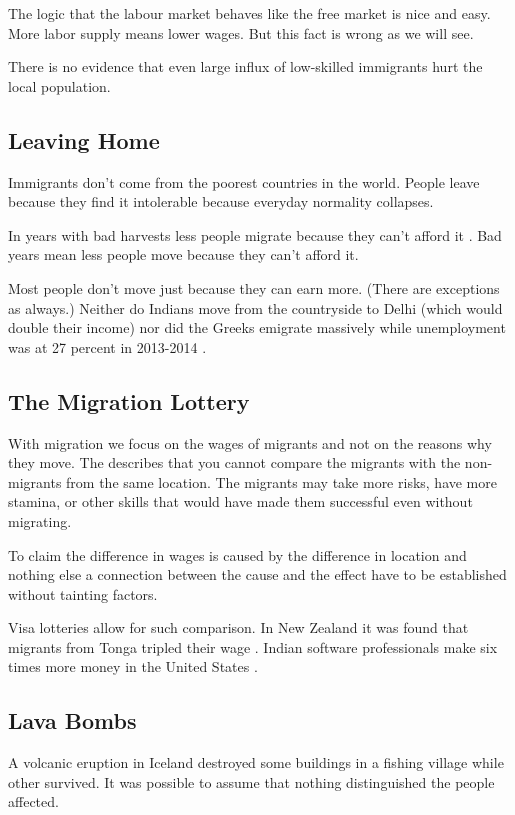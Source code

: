 \documentclass[a4paper, twocolumn]{article}
\let\oldsubsection\subsection
\newcounter{mysubsection}
\renewcommand{\subsection}{
    \stepcounter{mysubsection}
    \oldsubsection
}
\newcommand{\keyword}[1]{\textbf{\color{black}{#1}}}
\begin{document}
The logic that the labour market behaves like the free market is nice and easy. More labor supply means lower wages. But this fact is wrong as we will see.

There is no evidence that even large influx of low-skilled immigrants hurt the local population.

\subsection{Leaving Home}
Immigrants don't come from the poorest countries in the world. People leave because they find it intolerable because everyday normality collapses.

In years with bad harvests less people migrate because they can't afford it \cite{push-and-pull}.
Bad years mean less people move because they can't afford it.

Most people don't move just because they can earn more. (There are exceptions as always.) Neither do Indians move from the countryside to Delhi (which would double their income) nor did the Greeks emigrate massively while unemployment was at 27 percent in 2013-2014 \cite{greek-emigration}.

\subsection{The Migration Lottery}
With migration we focus on the wages of migrants and not on the reasons why they move. The \keyword{identification problem} describes that you cannot compare the migrants with the non-migrants from the same location. The migrants may take more risks, have more stamina, or other skills that would have made them successful even without migrating.

To claim the difference in wages is caused by the difference in location and nothing else a connection between the cause and the effect have to be established without tainting factors.

Visa lotteries allow for such comparison. In New Zealand it was found that migrants from Tonga tripled their wage \cite{new-zealand-lottery}. Indian software professionals make six times more money in the United States \cite{usa-lottery}.

\subsection{Lava Bombs}
A volcanic eruption in Iceland destroyed some buildings in a fishing village while other survived. It was possible to assume that nothing distinguished the people affected.
\end{document}
